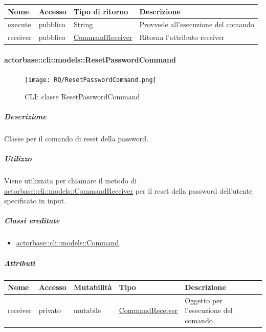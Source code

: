 \documentclass{scalatekids-article}
\begin{document}
\begin{tabular}{| l | l | l | l |}
  \hline
  Nome & Accesso & Tipo di ritorno & Descrizione\\
  \hline
  execute & pubblico & String & Provvede all'esecuzione del comando\\
  \hline
  receiver & pubblico & \hyperref[sec:actorbase::cli::models::CommandReceiver]{CommandReceiver} & Ritorna l'attributo receiver\\
  \hline
\end{tabular}

\paragraph{actorbase::cli::models::ResetPasswordCommand}
\label{sec:actorbase::cli::models::ResetPasswordCommand}

\begin{figure}[H]
  \begin{center}
    \texttt{[image: RQ/ResetPasswordCommand.png]}
    \caption{CLI: classe ResetPasswordCommand}
  \end{center}
\end{figure}

\subparagraph{Descrizione}

Classe per il comando di reset della password.

\subparagraph{Utilizzo}

Viene utilizzata per chiamare il metodo di
\hyperref[sec:actorbase::cli::models::CommandReceiver]{actorbase::cli::models::CommandReceiver} per il reset della password
dell'utente specificato in input.

\subparagraph{Classi ereditate}

\begin{itemize}
\item \hyperref[sec:actorbase::cli::models::Command]{actorbase::cli::models::Command}.
\end{itemize}

\subparagraph{Attributi}

\begin{tabular}{| p{1cm} | p{1.5cm} | p{2cm} | p{4cm} | p{8.5cm} |}
  \hline
  Nome & Accesso & Mutabilità & Tipo & Descrizione\\
  \hline
  receiver & privato & mutabile & \hyperref[sec:actorbase::cli::models::CommandReceiver]{CommandReceiver} & Oggetto per l'esecuzione del comando\\
  \hline
\end{tabular}
\end{document}
